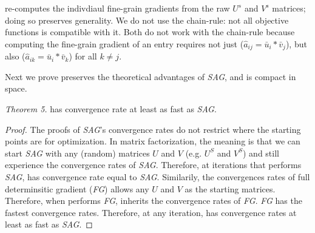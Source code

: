 \tool re-computes the indivdiaul fine-grain gradients from the raw $U^{s}$ and $V^{s}$ matrices; doing so preserves generality.
We do not use the chain-rule: not all objective functions is compatible with it.
Both \cite{climf, bpr} do not work with the chain-rule because computing the fine-grain gradient of an entry requires not just ($\hat{a}_{ij} = \bar{u}_{i}*\bar{v}_{j}$), 
but also ($\hat{a}_{ik} = \bar{u}_{i}*\bar{v}_{k}$) for all $k \neq j$.

Next we prove \tool preserves the theoretical advantages of \emph{SAG}, and \tool is compact in space.

\emph{Theorem 5.}
\tool has convergence rate at least as fast as \emph{SAG}.
\begin{proof}
The proofs of \emph{SAG}'s convergence rates \cite{schmidt2013minimizing, roux2012stochastic} do not restrict where the starting points are for optimization.
In matrix factorization, the meaning is that we can start \emph{SAG} with any (random) matrices $U$ and $V$ (e.g. $U^{S}$ and $V^{S}$)
and still experience the convergence rates of \emph{SAG}.
Therefore, at iterations that \tool performs \emph{SAG}, \tool has convergence rate equal to \emph{SAG}.
Similarily, the convergences rates of full determinsitic gradient (\emph{FG}) allows any $U$ and $V$ as the starting matrices.
Therefore, when \tool performs \emph{FG}, \tool inherits the convergence rates of \emph{FG}.
\emph{FG} has the fastest convergence rates.
Therefore, at any iteration, \tool has convergence rates at least as fast as \emph{SAG}.
\end{proof}



